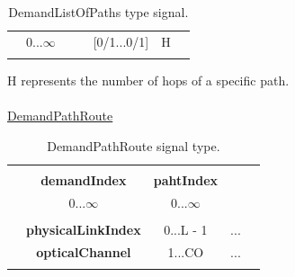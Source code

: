 \begin{table}[H]
\begin{tabular}{|lcccccl|}
		\multicolumn{1}{|l|}{} & \multicolumn{1}{c|}{0...$\infty$} & \multicolumn{1}{c|}{}                       & \multicolumn{1}{c|}{}                       & \multicolumn{1}{c|}{{[}0/1...0/1{]}} & \multicolumn{1}{c|}{H}                                                                                   &  \\ \cline{2-6}
		& \multicolumn{1}{l}{}              & \multicolumn{1}{l}{}                        & \multicolumn{1}{l}{}                        & \multicolumn{1}{l}{}                 & \multicolumn{1}{l}{}                                                                                         &  \\ \hline
	\end{tabular}
	\caption{DemandListOfPaths type signal.}
	\label{demandListOfPaths_example}
\end{table}

H represents the number of hops of a specific path.\\
\\
\underline{DemandPathRoute}\\
\begin{table}[H]
	\centering
	\begin{tabular}{|ccccc|}
		\hline
		&                                        &                                   &                          &                       \\ \cline{2-3}
		\multicolumn{1}{|c|}{} & \multicolumn{1}{c|}{\textbf{demandIndex}}       & \multicolumn{1}{c|}{\textbf{pahtIndex}}    &                          &                       \\ \cline{2-3}
		\multicolumn{1}{|c|}{} & \multicolumn{1}{c|}{0...$\infty$}      & \multicolumn{1}{c|}{0...$\infty$} &                          &                       \\ \cline{2-3}
		&                                        &                                   &                          &                       \\ \cline{2-4}
		\multicolumn{1}{|c|}{} & \multicolumn{1}{c|}{\textbf{physicalLinkIndex}} & \multicolumn{1}{c|}{0...L - 1}    & \multicolumn{1}{c|}{...} &                       \\ \cline{2-4}
		\multicolumn{1}{|l|}{} & \multicolumn{1}{c|}{\textbf{opticalChannel}}    & \multicolumn{1}{c|}{1...CO}       & \multicolumn{1}{c|}{...} & \multicolumn{1}{l|}{} \\ \cline{2-4}
		\multicolumn{1}{|l}{}  & \multicolumn{1}{l}{}                   & \multicolumn{1}{l}{}              & \multicolumn{1}{l}{}     & \multicolumn{1}{l|}{} \\ \hline
	\end{tabular}
	\caption{DemandPathRoute signal type.}
	\label{demandPathRoute_signal}
\end{table}

